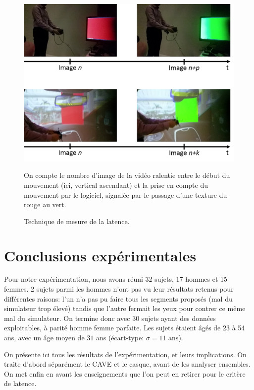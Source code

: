 	\begin{figure}
		\centering
		\includegraphics[scale=.8]{Figures/LatencyMeasureTechnique}
		\caption{Technique de mesure de la latence.}{On compte le nombre d'image de la vidéo ralentie entre le début du mouvement (ici, vertical ascendant) et la prise en compte du mouvement par le logiciel, signalée par le passage d'une texture du rouge au vert.}
		\label{fig:mesure_latence_video}
	\end{figure}
	
\chapter{Conclusions expérimentales}
	\par Pour notre expérimentation, nous avons réuni 32 sujets, 17 hommes et 15 femmes. 2 sujets parmi les hommes n'ont pas vu leur résultats retenus pour différentes raisons: l'un n'a pas pu faire tous les segments proposés (mal du simulateur trop élevé) tandis que l'autre fermait les yeux pour contrer ce même mal du simulateur. On termine donc avec 30 sujets ayant des données exploitables, à parité homme femme parfaite. Les sujets étaient âgés de 23 à 54 ans, avec un âge moyen de $31$ ans (écart-type: $\sigma = 11$ ans).
	
	\par On présente ici tous les résultats de l'expérimentation, et leurs implications. On traite d'abord séparément le CAVE et le casque, avant de les analyser ensembles. On met enfin en avant les enseignements que l'on peut en retirer pour le critère de latence.
	

